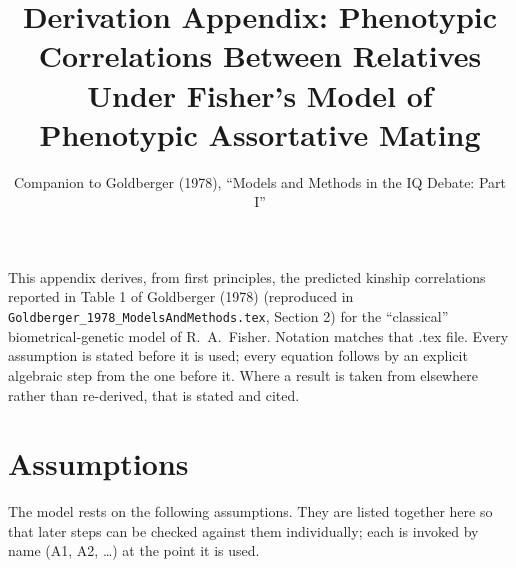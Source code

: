 \documentclass[12pt]{article}
\title{Derivation Appendix: Phenotypic Correlations Between Relatives\\ Under Fisher's Model of Phenotypic Assortative Mating}
\author{Companion to Goldberger (1978), ``Models and Methods in the IQ Debate: Part I''}
\date{}
\begin{document}
\maketitle

\noindent This appendix derives, from first principles, the predicted kinship correlations reported in Table 1 of Goldberger (1978) (reproduced in \texttt{Goldberger\_1978\_ModelsAndMethods.tex}, Section 2) for the ``classical'' biometrical-genetic model of R.\ A.\ Fisher. Notation matches that .tex file. Every assumption is stated before it is used; every equation follows by an explicit algebraic step from the one before it. Where a result is taken from elsewhere rather than re-derived, that is stated and cited.

\section{Assumptions}

The model rests on the following assumptions. They are listed together here so that later steps can be checked against them individually; each is invoked by name (A1, A2, \ldots) at the point it is used.
\end{document}

